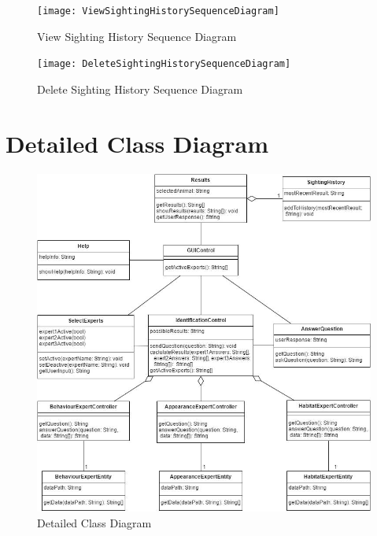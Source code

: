 \documentclass[]{article}
\begin{document}
\begin{figure}[H]
	\centering
	\texttt{[image: ViewSightingHistorySequenceDiagram]}
	\caption{View Sighting History Sequence Diagram}
	\label{View Sighting History Sequence Diagram}
\end{figure}

\begin{figure}[H]
	\centering
	\texttt{[image: DeleteSightingHistorySequenceDiagram]}
	\caption{Delete Sighting History Sequence Diagram}
	\label{Delete Sighting History Sequence Diagram}
\end{figure}


\section{Detailed Class Diagram}
\label{sec:detailed_class_diagram}
\begin{figure}[H]
	\centering
	\includegraphics[width = 14cm]{DetailedClassDiagram}
	\caption{Detailed Class Diagram}
	\label{Detailed Class Diagram}
\end{figure}
\end{document}
